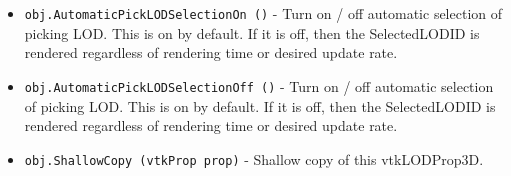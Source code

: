 \begin{itemize}
\item  \verb|obj.AutomaticPickLODSelectionOn ()| -  Turn on / off automatic selection of picking LOD. 
 This is on by default. If it is off, then the SelectedLODID is 
 rendered regardless of rendering time or desired update rate. 

\item  \verb|obj.AutomaticPickLODSelectionOff ()| -  Turn on / off automatic selection of picking LOD. 
 This is on by default. If it is off, then the SelectedLODID is 
 rendered regardless of rendering time or desired update rate. 

\item  \verb|obj.ShallowCopy (vtkProp prop)| -  Shallow copy of this vtkLODProp3D.

\end{itemize}

